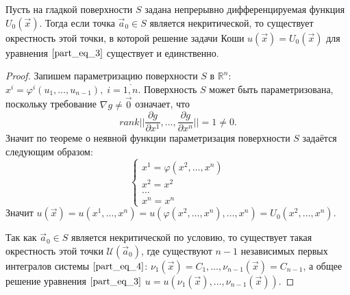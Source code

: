 \begin{theorem}
	Пусть на гладкой поверхности $S$ задана непрерывно дифференцируемая функция $U_0 \left( \vec{x} \right)$. Тогда если точка $\vec{a}_0 \in S$ является некритической, то существует окрестность этой точки, в которой решение задачи Коши $u \left( \vec{x} \right) = U_0 \left( \vec{x} \right)$ для уравнения $\eqref{part_eq_3}$ существует и единственно.
\end{theorem}
\begin{proof}
	Запишем параметризацию поверхности $S$ в $\mathbb{R}^n$: $x^i = \varphi^i \left( u_1, \dots, u_{n - 1} \right), \; i = \overline{1, n}$. Поверхность $S$ может быть параметризована, поскольку требование $\nabla g \neq \vec{0}$ означает, что 
	\begin{equation*}
		rank \bigg| \bigg| \frac{\partial g}{\partial x^{1}}, \dots, \frac{\partial g}{\partial x^{n}} \bigg| \bigg| = 1 \neq 0.
	\end{equation*}
	Значит по теореме о неявной функции параметризация поверхности $S$ задаётся следующим образом:
	\begin{equation*}
		\begin{cases}
			x^1 = \varphi \left( x^2, \dots, x^n \right) \\
			x^2 = x^2                                    \\
			\dots                                        \\
			x^n = x^n
		\end{cases}
	\end{equation*}
	Значит $u \left( \vec{x} \right) = u \left( x^1, \dots, x^n \right) = u \left( \varphi \left( x^2, \dots, x^n \right), \dots, x^n \right) = U_0 \left( x^2, \dots, x^n \right)$.
	
	Так как $\vec{a}_0 \in S$ является некритической по условию, то существует такая окрестность этой точки $\mathcal{U}  \left( \vec{a}_0 \right)$, где существуют $n - 1$ независимых первых интегралов системы $\eqref{part_eq_4}$: $\nu_1 \left( \vec{x} \right) = C_1, \dots, \nu_{n - 1} \left( \vec{x} \right) = C_{n - 1}$, а общее решение уравнения $\eqref{part_eq_3}$ $u = u \left( \nu_1 \left( \vec{x} \right), \dots, \nu_{n - 1} \left( \vec{x} \right) \right)$. 


\end{proof}
